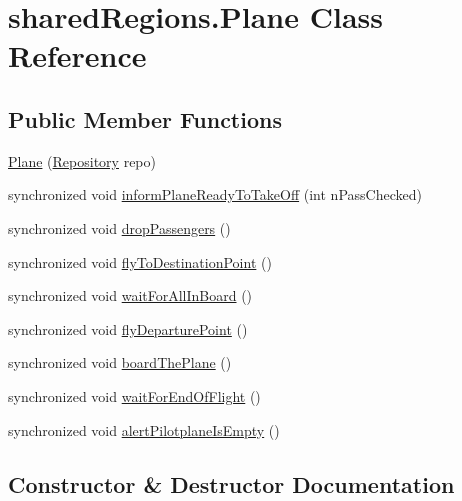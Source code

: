 \hypertarget{classshared_regions_1_1_plane}{}\section{shared\+Regions.\+Plane Class Reference}
\label{classshared_regions_1_1_plane}
\subsection*{Public Member Functions}
\begin{DoxyCompactItemize}
\item 
\hyperlink{classshared_regions_1_1_plane_a37fe2efb3bdf4e0287cbb795aedaff24}{Plane} (\hyperlink{classshared_regions_1_1_repository}{Repository} repo)
\item 
synchronized void \hyperlink{classshared_regions_1_1_plane_adee39c6d4cc4151349e9b3f9dd9c8f9e}{inform\+Plane\+Ready\+To\+Take\+Off} (int n\+Pass\+Checked)
\item 
synchronized void \hyperlink{classshared_regions_1_1_plane_a2a149380a2b96b06d85d84b4b7490068}{drop\+Passengers} ()
\item 
synchronized void \hyperlink{classshared_regions_1_1_plane_a14092728e37c693cce80f31c0096e467}{fly\+To\+Destination\+Point} ()
\item 
synchronized void \hyperlink{classshared_regions_1_1_plane_a8520969010cb85cbff07deb3f1a0f003}{wait\+For\+All\+In\+Board} ()
\item 
synchronized void \hyperlink{classshared_regions_1_1_plane_aa6a53f1bb5882641937018e78100272f}{fly\+Departure\+Point} ()
\item 
synchronized void \hyperlink{classshared_regions_1_1_plane_a900b3a6f9a7ab1a5111a71175c6ed991}{board\+The\+Plane} ()
\item 
synchronized void \hyperlink{classshared_regions_1_1_plane_a5a0b3cd50c5832849185293e70d9725b}{wait\+For\+End\+Of\+Flight} ()
\item 
synchronized void \hyperlink{classshared_regions_1_1_plane_a86935f69418facbb8f40c742d93195c9}{alert\+Pilotplane\+Is\+Empty} ()
\end{DoxyCompactItemize}


\subsection{Constructor \& Destructor Documentation}
\mbox{\label{classshared_regions_1_1_plane_a37fe2efb3bdf4e0287cbb795aedaff24}} 
